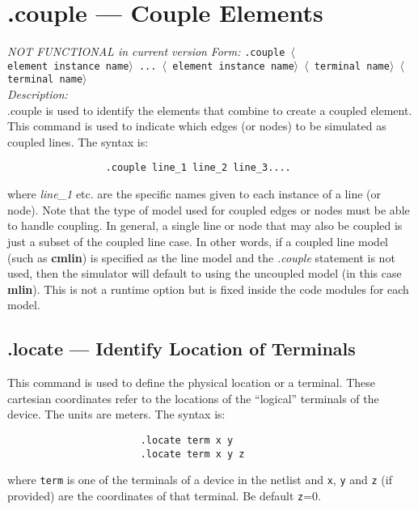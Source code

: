 \clearpage
\section{.couple  --- Couple Elements}

{\em NOT FUNCTIONAL in current version}
\noindent\textit{Form:}
\newline
{\tt .couple $\langle$ \tt{element\ instance\ name}$\rangle$ ... $\langle$
\tt{element\ instance\ name}$\rangle$ $\langle$ \tt{terminal\
name}$\rangle$ $\langle$ \tt{terminal\ name}$\rangle$}\\[0.2in]
\newline
\textit{Description:}\\
.couple is used to identify the elements that combine to create a coupled element.\\[0.2in]

This command is used to indicate which edges (or nodes) to be
simulated as coupled lines.  The syntax is:
\begin{tt}
\begin{verbatim}
                 .couple line_1 line_2 line_3....
\end{verbatim}
\end{tt}
where {\em line\_1} etc. are the specific names given to each
instance of a line (or node).  Note that the type of model used
for coupled edges or nodes must be able to handle coupling.  In
general, a single line or node that may also be coupled is just a
subset of the coupled line case.  In other words, if a coupled
line model (such as {\bf cmlin}) is specified as the line model
and the {\em .couple} statement is not used, then the simulator
will default to using the uncoupled model (in this case {\bf
mlin}).  This is not a runtime option but is fixed inside the code
modules for each model.

\clearpage
\subsection{.locate --- Identify Location of Terminals}

This command is used to define the physical location or a terminal.  These cartesian
coordinates refer to the locations of the ``logical'' terminals of
the device.  The units are meters.  The syntax is:
\begin{tt}
\begin{verbatim}
                       .locate term x y
                       .locate term x y z
\end{verbatim}
\end{tt}
where {\tt term} is one of the terminals of a device in the
netlist and {\tt x}, {\tt y} and {\tt z} (if provided) are the
coordinates of that terminal. Be default {\tt z}=0.

